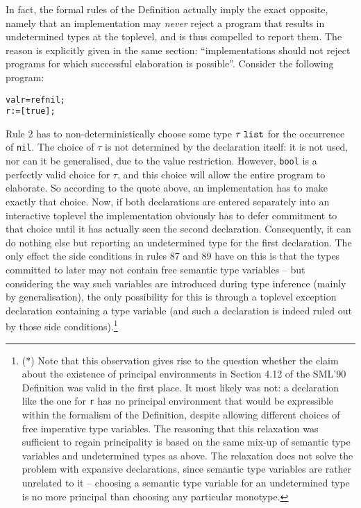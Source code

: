 \documentclass[twoside,titlepage]{article}
\begin{document}
\begin{appendix}
In fact, the formal rules of the Definition actually imply the exact opposite, namely that an implementation may {\em never} reject a program that results in undetermined types at the toplevel, and is thus compelled to report them. The reason is explicitly given in the same section: ``implementations should not reject programs for which successful elaboration is possible''. Consider the following program:

\begin{quoting}
\begin{alltt}
val r = ref nil;
r := [true];
\end{alltt}
\end{quoting}

Rule 2 has to non-deterministically choose some type $\tau\;{\tt list}$ for the occurrence of {\tt nil}. The choice of $\tau$ is not determined by the declaration itself: it is not used, nor can it be generalised, due to the value restriction. However, {\tt bool} is a perfectly valid choice for $\tau$, and this choice will allow the entire program to elaborate. So according to the quote above, an implementation has to make exactly that choice. Now, if both declarations are entered separately into an interactive toplevel the implementation obviously has to defer commitment to that choice until it has actually seen the second declaration. Consequently, it can do nothing else but reporting an undetermined type for the first declaration. The only effect the side conditions in rules 87 and 89 have on this is that the types committed to later may not contain free semantic type variables -- but considering the way such variables are introduced during type inference (mainly by generalisation), the only possibility for this is through a toplevel exception declaration containing a type variable (and such a declaration is indeed ruled out by those side conditions).\footnote{(*) Note that this observation gives rise to the question whether the claim about the existence of principal environments in Section 4.12 of the SML'90 Definition \cite{definition90} was valid in the first place. It most likely was not: a declaration like the one for {\tt r} has no principal environment that would be expressible within the formalism of the Definition, despite allowing different choices of free imperative type variables. The reasoning that this relaxation was sufficient to regain principality is based on the same mix-up of semantic type variables and undetermined types as above. The relaxation does not solve the problem with expansive declarations, since semantic type variables are rather unrelated to it -- choosing a semantic type variable for an undetermined type is no more principal than choosing any particular monotype.}


\end{appendix}
\end{document}
